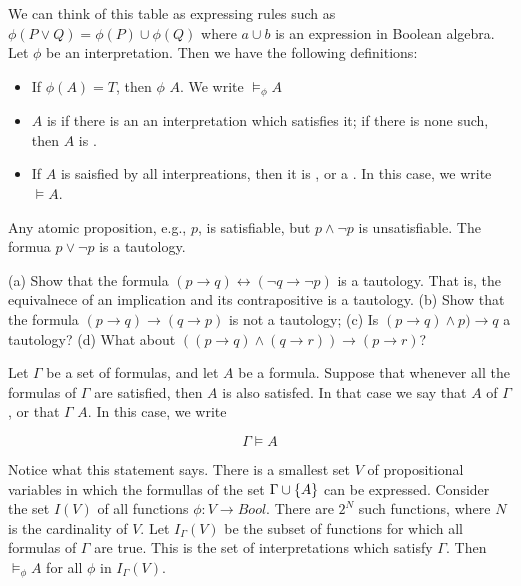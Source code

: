 We can think of this table as expressing rules such as $\phi(P \lor Q) = \phi(P) \cup \phi(Q)$ where $a \cup b$  is an expression in  Boolean algebra. Let $\phi$ be an interpretation. Then we have the following definitions:

\begin{itemize}

\item If $\phi(A) =T$, then  $\phi$  $A$.  We write $\models_\phi A$

\item $A$ is  if there is an an interpretation which satisfies it; if there is none such, then $A$ is .

\item If $A$ is saisfied by all interpreations, then it is , or a .  In this case, we write $\models A$.

\end{itemize}

Any atomic  proposition, e.g., $p$, is satisfiable, but  $p \land \neg p$ is unsatisfiable.  The formua  $p  \lor \neg p$ is a tautology.

\begin{exercise}
(a) Show that the formula $(p \to q) \leftrightarrow (\neg q \to \neg p)$ is a tautology.  That is, the equivalnece of an implication and its contrapositive is a tautology. (b) Show that the formula $(p \to q) \to (q \to  p)$ is not a tautology;
(c) Is $(p \to q) \land p) \to q$ a tautology? (d) What about $((p \to q) \land (q \to r)) \to (p \to r)$?
\end{exercise}


Let $\Gamma$ be a set of formulas, and let $A$ be a formula.  Suppose that whenever all the formulas of $\Gamma$ are satisfied,  then $A$  is also satisfed. In that case we say that $A$  of $\Gamma$, or that $\Gamma$  $A$.  In this case, we write

$$
\Gamma \models A
$$

Notice what this statement says.  There is a smallest set $V$ of propositional variables in which the formullas of the set $\Gamma \cup \{ A \}$ can be expressed.  Consider the set $I(V)$ of all functions $\phi: V \to Bool$.  There are $2^N$ such functions, where $N$ is the cardinality of $V$.  Let $I_\Gamma(V)$ be the subset of functions for which all formulas of $\Gamma$ are true.  This is the set of interpretations which satisfy $\Gamma$. Then $\models_\phi A$ for all $\phi$ in $I_\Gamma(V)$.


